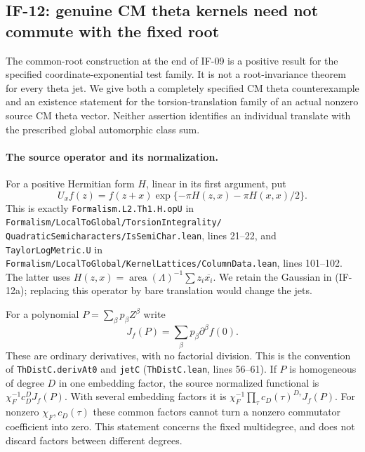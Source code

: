 \subsection{IF-12: genuine CM theta kernels need not commute with the fixed root}
The common-root construction at the end of IF-09 is a positive result
for the specified coordinate-exponential test family. It is not a
root-invariance theorem for every theta jet. We give both a completely
specified CM theta counterexample and an existence statement for the
torsion-translation family of an actual nonzero source CM theta vector.
Neither assertion identifies an individual translate with the prescribed
global automorphic class sum.

\paragraph{The source operator and its normalization.}
For a positive Hermitian form $H$, linear in its first argument, put
\[
 U_x f(z)=f(z+x)\exp\{-\pi H(z,x)-\pi H(x,x)/2\}.       \tag{IF-12a}
\]
This is exactly \texttt{Formalism.L2.Th1.H.opU} in
\texttt{Formalism/LocalToGlobal/TorsionIntegrality/}
\texttt{QuadraticSemicharacters/IsSemiChar.lean}, lines 21--22,
and \texttt{TaylorLogMetric.U} in
\texttt{Formalism/LocalToGlobal/KernelLattices/ColumnData.lean},
lines 101--102. The latter uses
$H(z,x)=\operatorname{area}(\Lambda)^{-1}\sum z_i\overline{x_i}$.
We retain the Gaussian in (IF-12a); replacing this operator by bare
translation would change the jets.

For a polynomial $P=\sum_\beta p_\beta Z^\beta$ write
\[
 J_f(P)=\sum_\beta p_\beta\partial^\beta f(0).
                                                               \tag{IF-12b}
\]
These are ordinary derivatives, with no factorial division. This is
the convention of \texttt{ThDistC.derivAt0} and \texttt{jetC}
(\texttt{ThDistC.lean}, lines 56--61). If $P$ is homogeneous of degree $D$ in one
embedding factor, the source normalized functional is
$\chi_F^{-1}c_D^D J_f(P)$. With several embedding factors it is
$\chi_F^{-1}\prod_\tau c_D(\tau)^{D_\tau}J_f(P)$.
For nonzero $\chi_F,c_D(\tau)$ these common factors cannot turn a
nonzero commutator coefficient into zero. This statement concerns the
fixed multidegree, and does not discard factors between different
degrees.

